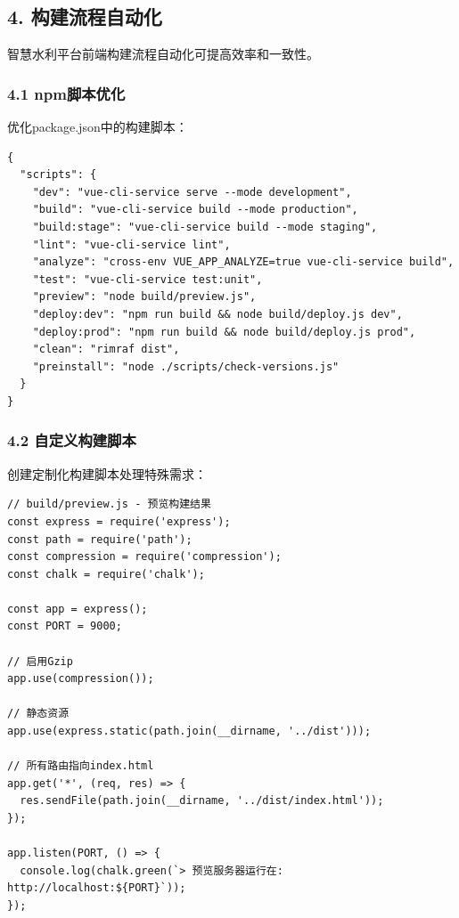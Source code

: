 \subsection{4.
构建流程自动化}\label{ux6784ux5efaux6d41ux7a0bux81eaux52a8ux5316}

智慧水利平台前端构建流程自动化可提高效率和一致性。

\subsubsection{4.1 npm脚本优化}\label{npmux811aux672cux4f18ux5316}

优化package.json中的构建脚本：

\begin{lstlisting}
{
  "scripts": {
    "dev": "vue-cli-service serve --mode development",
    "build": "vue-cli-service build --mode production",
    "build:stage": "vue-cli-service build --mode staging",
    "lint": "vue-cli-service lint",
    "analyze": "cross-env VUE_APP_ANALYZE=true vue-cli-service build",
    "test": "vue-cli-service test:unit",
    "preview": "node build/preview.js",
    "deploy:dev": "npm run build && node build/deploy.js dev",
    "deploy:prod": "npm run build && node build/deploy.js prod",
    "clean": "rimraf dist",
    "preinstall": "node ./scripts/check-versions.js"
  }
}
\end{lstlisting}

\subsubsection{4.2
自定义构建脚本}\label{ux81eaux5b9aux4e49ux6784ux5efaux811aux672c}

创建定制化构建脚本处理特殊需求：

\begin{lstlisting}
// build/preview.js - 预览构建结果
const express = require('express');
const path = require('path');
const compression = require('compression');
const chalk = require('chalk');

const app = express();
const PORT = 9000;

// 启用Gzip
app.use(compression());

// 静态资源
app.use(express.static(path.join(__dirname, '../dist')));

// 所有路由指向index.html
app.get('*', (req, res) => {
  res.sendFile(path.join(__dirname, '../dist/index.html'));
});

app.listen(PORT, () => {
  console.log(chalk.green(`> 预览服务器运行在: http://localhost:${PORT}`));
});
\end{lstlisting}

